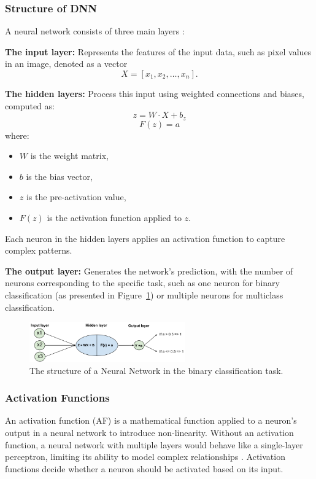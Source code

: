 \subsubsection{Structure of DNN}
A neural network consists of three main layers \parencite{ren2023review}:

\noindent
\textbf{The input layer:} Represents the features of the input data, such as pixel values in an image, denoted as a vector 
\[
X = [x_1, x_2, \dots, x_n].
\]

\noindent
\textbf{The hidden layers:} Process this input using weighted connections and biases, computed as:
\[
z = W \cdot X + b_z \tag{1}
\]
\[
F(z) = a \tag{2}
\]
where:
\begin{itemize}
    \item $W$ is the weight matrix,
    \item $b$ is the bias vector,
    \item $z$ is the pre-activation value,
    \item $F(z)$ is the activation function applied to $z$.
\end{itemize}

Each neuron in the hidden layers applies an activation function to capture complex patterns.

\noindent
\textbf{The output layer:} Generates the network's prediction, with the number of neurons corresponding to the specific task, such as one neuron for binary classification (as presented in Figure~\ref{fig:figure02}) or multiple neurons for multiclass classification.



\begin{figure}[H] %
    \centering
    \includegraphics[width=0.6\textwidth]{chapters/chapter1/images/Figure02.png}
    \caption{The structure of a Neural Network in the binary classification task.}
    \label{fig:figure02}
\end{figure}

\subsubsection{Activation Functions}
An activation function (AF) is a mathematical function applied to a neuron's output in a neural network to introduce non-linearity. Without an activation function, a neural network with multiple layers would behave like a single-layer perceptron, limiting its ability to model complex relationships \parencite{dubey2022activation}. Activation functions decide whether a neuron should be activated based on its input. 

